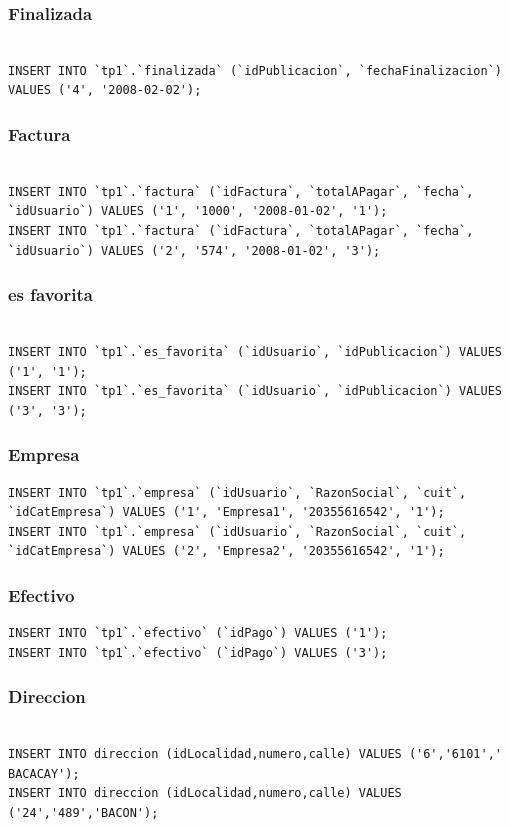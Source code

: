 \documentclass[a4paper, 10pt, twoside]{article}
\begin{document}
\subsubsection{Finalizada}
\begin{verbatim}

INSERT INTO `tp1`.`finalizada` (`idPublicacion`, `fechaFinalizacion`) VALUES ('4', '2008-02-02');

\end{verbatim}
\subsubsection{Factura}
\begin{verbatim}

INSERT INTO `tp1`.`factura` (`idFactura`, `totalAPagar`, `fecha`, `idUsuario`) VALUES ('1', '1000', '2008-01-02', '1');
INSERT INTO `tp1`.`factura` (`idFactura`, `totalAPagar`, `fecha`, `idUsuario`) VALUES ('2', '574', '2008-01-02', '3');
\end{verbatim}
\subsubsection{es favorita}
\begin{verbatim}

INSERT INTO `tp1`.`es_favorita` (`idUsuario`, `idPublicacion`) VALUES ('1', '1');
INSERT INTO `tp1`.`es_favorita` (`idUsuario`, `idPublicacion`) VALUES ('3', '3');
\end{verbatim}
\subsubsection{Empresa}
\begin{verbatim}
INSERT INTO `tp1`.`empresa` (`idUsuario`, `RazonSocial`, `cuit`, `idCatEmpresa`) VALUES ('1', 'Empresa1', '20355616542', '1');
INSERT INTO `tp1`.`empresa` (`idUsuario`, `RazonSocial`, `cuit`, `idCatEmpresa`) VALUES ('2', 'Empresa2', '20355616542', '1');

\end{verbatim}
\subsubsection{Efectivo}
\begin{verbatim}
INSERT INTO `tp1`.`efectivo` (`idPago`) VALUES ('1');
INSERT INTO `tp1`.`efectivo` (`idPago`) VALUES ('3');

\end{verbatim}
\subsubsection{Direccion}
\begin{verbatim}

INSERT INTO direccion (idLocalidad,numero,calle) VALUES ('6','6101',' BACACAY');
INSERT INTO direccion (idLocalidad,numero,calle) VALUES ('24','489','BACON');
\end{verbatim}
\end{document}
